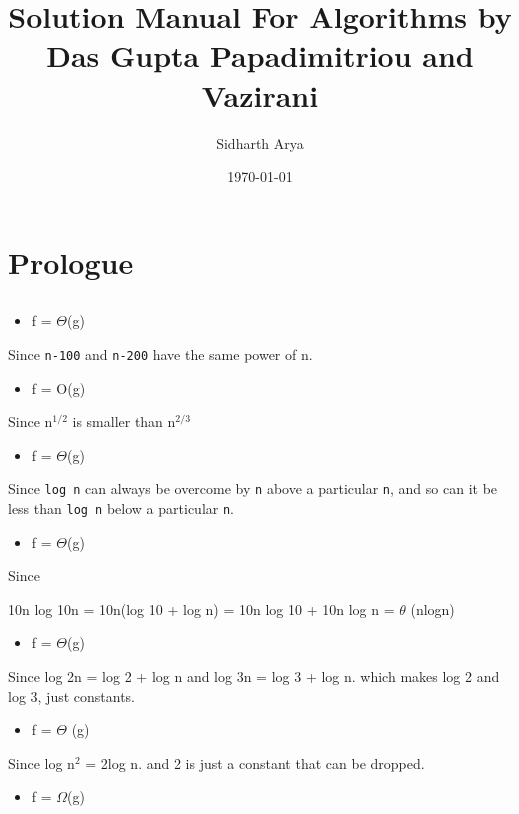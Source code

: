 \documentclass{book}
\author{Sidharth Arya}
\date{\today}
\title{Solution Manual For Algorithms by Das Gupta Papadimitriou and Vazirani}
\begin{document}
\maketitle
\frontmatter
\setcounter{tocdepth}{0}
\tableofcontents
\chapter{Prologue}
\label{sec:orgdfc9ed9}
\section{}
\label{sec:orge073fc5}
\begin{itemize}
\item f = \(\Theta\)(g)
\end{itemize}

Since \texttt{n-100} and \texttt{n-200} have the same power of n.
\begin{itemize}
\item f = O(g)
\end{itemize}

Since n\(^{\text{1/2}}\) is smaller than n\(^{\text{2/3}}\)
\begin{itemize}
\item f = \(\Theta\)(g)
\end{itemize}

Since \texttt{log n} can always be overcome by \texttt{n} above a particular \texttt{n},  and so can it be less than \texttt{log n} below a particular \texttt{n}. 
\begin{itemize}
\item f = \(\Theta\)(g)
\end{itemize}

Since 
\begin{EQUATION}
10n log 10n 
= 10n(log 10 + log n)
= 10n log 10 + 10n log n
= \(\theta\) (nlogn)
\end{EQUATION}
\begin{itemize}
\item f = \(\Theta\)(g)
\end{itemize}

Since log 2n = log 2 + log n and log 3n = log 3 + log n. which makes log 2 and log 3, just constants.
\begin{itemize}
\item f = \(\Theta\) (g)
\end{itemize}

Since log n\(^{\text{2}}\) = 2log n. and 2 is just a constant that can be dropped.
\begin{itemize}
\item f = \(\Omega\)(g)
\end{itemize}
\end{document}
